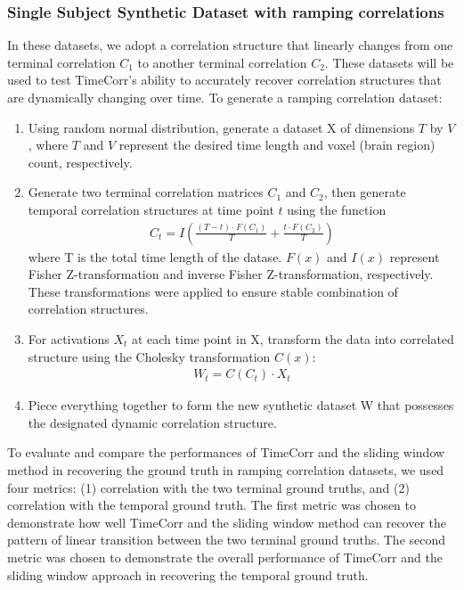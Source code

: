 \documentclass[11pt]{article}
\begin{document}
\subsubsection{Single Subject Synthetic Dataset with ramping correlations}

In these datasets, we adopt a correlation structure that linearly changes from one terminal correlation $C_1$ to another terminal correlation $C_2$. These datasets will be used to test TimeCorr's ability to accurately recover correlation structures that are dynamically changing over time. To generate a ramping correlation dataset:
\begin{enumerate}
\item Using random normal distribution, generate a dataset X of dimensions $T$ by $V$, where $T$ and $V$ represent the desired time length and voxel (brain region) count, respectively.
\item Generate two terminal correlation matrices $C_1$ and $C_2$, then generate temporal correlation structures at time point $t$ using the function
\begin{align*}
C_t = I\left(\frac{(T-t) \cdot F(C_1)}{T} + \frac{t\cdot F(C_2)}{T}\right)
\end{align*}
where T is the total time length of the datase. $F(x)$ and $I(x)$ represent Fisher Z-transformation and inverse Fisher Z-transformation, respectively. These transformations were applied to ensure stable combination of correlation structures.
\item For activations $X_t$ at each time point in X, transform the data into correlated structure using the Cholesky transformation $C(x)$:
\begin{align*}
W_t = C(C_t) \cdot X_t
\end{align*}
\item Piece everything together to form the new synthetic dataset W that possesses the designated dynamic correlation structure.
\end{enumerate}

To evaluate and compare the performances of TimeCorr and the sliding window method in recovering the ground truth in ramping correlation datasets, we used four metrics: (1) correlation with the two terminal ground truths, and (2) correlation with the temporal ground truth. The first metric was chosen to demonstrate how well TimeCorr and the sliding window method can recover the pattern of linear transition between the two terminal ground truths. The second metric was chosen to demonstrate the overall performance of TimeCorr and the sliding window approach in recovering the temporal ground truth.
\end{document}
